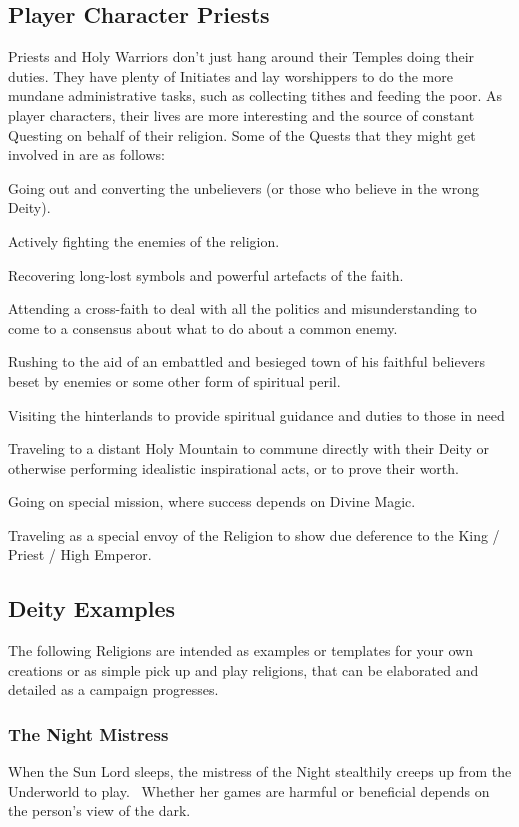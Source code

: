 \subsection{Player Character Priests}
Priests and Holy Warriors don’t just hang around their Temples doing their duties. They have plenty of Initiates and lay worshippers to do the more mundane administrative tasks, such as collecting tithes and feeding the poor. As player characters, their lives are more interesting and the source of constant Questing on behalf of their religion. Some of the Quests that they might get involved in are as follows:
\begin{rpg-list}
\item Going out and converting the unbelievers (or those who believe in the wrong Deity).
\item Actively fighting the enemies of the religion.
\item Recovering long-lost symbols and powerful artefacts of the faith. 
\item Attending a cross-faith to deal with all the politics and misunderstanding to come to a consensus about what to do about a common enemy.
\item Rushing to the aid of an embattled and besieged town of his faithful believers beset by enemies or some other form of spiritual peril.
\item Visiting the hinterlands to provide spiritual guidance and duties to those in need
\item Traveling to a distant Holy Mountain to commune directly with their Deity or otherwise performing idealistic inspirational acts, or to prove their worth.
\item Going on special mission, where success depends on Divine Magic.
\item Traveling as a special envoy of the Religion to show due deference to the King / Priest / High Emperor.
\end{rpg-list}


\subsection{Deity Examples}
\label{ssec:deities}
The following Religions are intended as examples or templates for your own creations or as simple pick up and play religions, that can be elaborated and detailed as a campaign progresses.

\subsubsection{The Night Mistress}
When the Sun Lord sleeps, the mistress of the Night stealthily creeps up from the Underworld to play.  Whether her games are harmful or beneficial depends on the person's view of the dark.

